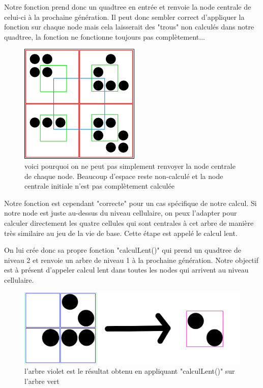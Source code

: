 Notre fonction prend donc un quadtree en entrée et renvoie la node centrale de celui-ci à la prochaine génération. Il peut donc sembler correct d'appliquer la fonction sur chaque node mais cela laisserait des "trous" non calculés dans notre quadtree, la fonction ne fonctionne toujours pas complètement...

\begin{figure}[htp]
        \center
        \includegraphics[scale=0.7]{images/imgHashlife/GOLfig2.png}
        \caption{voici pourquoi on ne peut pas simplement renvoyer la node centrale de chaque node. Beaucoup d'espace reste non-calculé et la node centrale initiale n'est pas complètement calculée }
\end{figure}

Notre fonction est cependant "correcte" pour un cas spécifique de notre calcul. Si notre node est juste au-dessus du niveau cellulaire, on peux l'adapter pour calculer directement les quatre cellules qui sont centrales à cet arbre de manière très similaire au jeu de la vie de base. Cette étape est appelé le calcul lent.

On lui crée donc sa propre fonction "calculLent()" qui prend un quadtree de niveau 2 et renvoie un arbre de niveau 1 à la prochaine génération. Notre objectif est à présent d'appeler calcul lent dans toutes les nodes qui arrivent au niveau cellulaire.

\begin{figure}[htp]
        \center
        \includegraphics[scale=0.4]{images/imgHashlife/GOLfig3.png}
        \caption{l'arbre violet est le résultat obtenu en appliquant "calculLent()" sur l'arbre vert}
\end{figure}


